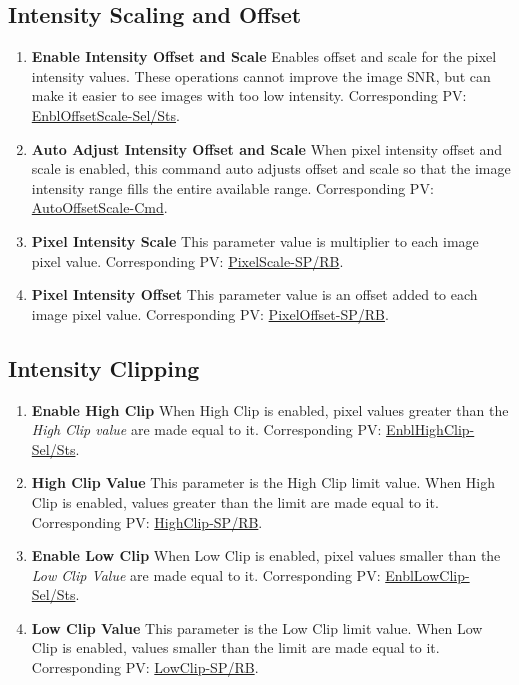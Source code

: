 \documentclass[openany]{article}
\begin{document}
    \subsection{Intensity Scaling and Offset}\label{sec:scaling}

        \begin{enumerate}
            \item \textbf{Enable Intensity Offset and Scale} Enables offset and scale for the pixel intensity values. These operations cannot improve the image SNR, but can make it easier to see images with too low intensity. Corresponding PV: \hyperlink{pv:enbl-offset-scale}{EnblOffsetScale-Sel/Sts}.
            \item \textbf{Auto Adjust Intensity Offset and Scale} When pixel intensity offset and scale is enabled, this command auto adjusts offset and scale so that the image intensity range fills the entire available range. Corresponding PV: \hyperlink{pv:auto-offset-scale}{AutoOffsetScale-Cmd}.
            \item \textbf{Pixel Intensity Scale} This parameter value is multiplier to each image pixel value. Corresponding PV: \hyperlink{pv:pixel-scale}{PixelScale-SP/RB}.
            \item \textbf{Pixel Intensity Offset} This parameter value is an offset added to each image pixel value. Corresponding PV: \hyperlink{pv:pixel-offset}{PixelOffset-SP/RB}.
        \end{enumerate}

    \subsection{Intensity Clipping}\label{sec:clipping}

        \begin{enumerate}
            \item \textbf{Enable High Clip} When High Clip is enabled, pixel values greater than the \emph{High Clip value} are made equal to it. Corresponding PV: \hyperlink{pv:enbl-high-clip}{EnblHighClip-Sel/Sts}.
            \item \textbf{High Clip Value} This parameter is the High Clip limit value. When High Clip is enabled, values greater than the limit are made equal to it. Corresponding PV: \hyperlink{pv:high-clip}{HighClip-SP/RB}.
            \item \textbf{Enable Low Clip}  When Low Clip is enabled, pixel values smaller than the \emph{Low Clip Value} are made equal to it. Corresponding PV: \hyperlink{pv:enbl-low-clip}{EnblLowClip-Sel/Sts}.
            \item \textbf{Low Clip Value} This parameter is the Low Clip limit value. When Low Clip is enabled, values smaller than the limit are made equal to it. Corresponding PV: \hyperlink{pv:low-clip}{LowClip-SP/RB}.
        \end{enumerate}
\end{document}
